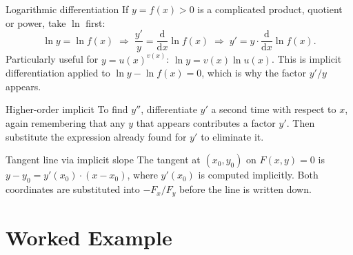 \begin{rulebox}{Logarithmic differentiation}
If $y=f(x)>0$ is a complicated product, quotient or power, take $\ln$
first:
\[
  \ln y=\ln f(x)
  \;\Longrightarrow\;
  \frac{y'}{y}=\frac{\mathrm{d}}{\mathrm{d}x}\ln f(x)
  \;\Longrightarrow\;
  y'=y\cdot\frac{\mathrm{d}}{\mathrm{d}x}\ln f(x) .
\]
Particularly useful for $y=u(x)^{v(x)}$: $\ln y=v(x)\ln u(x)$. This is
implicit differentiation applied to $\ln y-\ln f(x)=0$, which is why the
factor $y'/y$ appears.
\end{rulebox}

\begin{rulebox}{Higher-order implicit}
To find $y''$, differentiate $y'$ a second time with respect to $x$, again
remembering that any $y$ that appears contributes a factor $y'$. Then
substitute the expression already found for $y'$ to eliminate it.
\end{rulebox}

\begin{rulebox}{Tangent line via implicit slope}
The tangent at $(x_{0},y_{0})$ on $F(x,y)=0$ is
$y-y_{0}=y'(x_{0})\cdot(x-x_{0})$, where $y'(x_{0})$ is computed
implicitly. Both coordinates are substituted into $-F_{x}/F_{y}$ before the
line is written down.
\end{rulebox}

\section{Worked Example}

